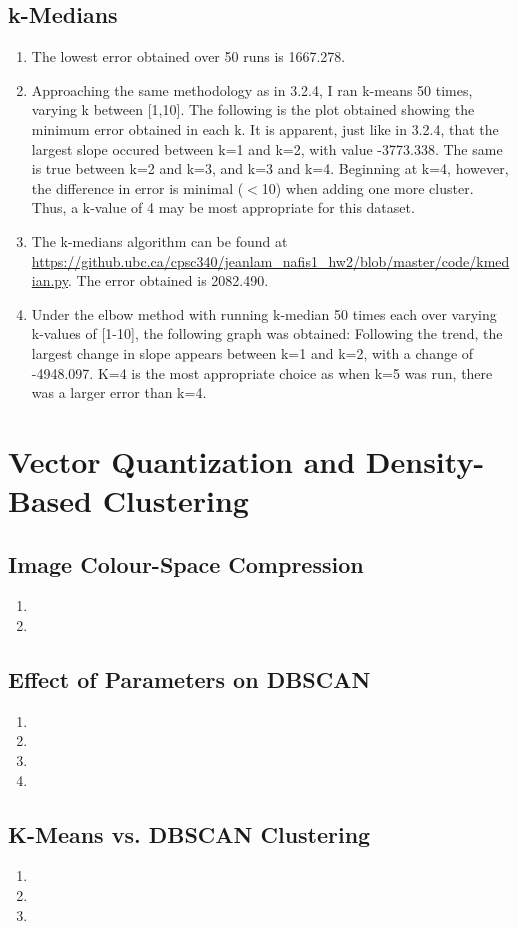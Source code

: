 \documentclass{article}
\begin{document}
\subsection{k-Medians}
\begin{enumerate}
\item {} The lowest error obtained over 50 runs is 1667.278.
\item Approaching the same methodology as in 3.2.4, I ran k-means 50 times, varying k between [1,10]. The following is the plot obtained showing the minimum error obtained in each k.  It is apparent, just like in 3.2.4, that the largest slope occured between k=1 and k=2, with value -3773.338. The same is true between k=2 and k=3, and k=3 and k=4. Beginning at k=4, however, the difference in error is minimal (${<}$10) when adding one more cluster. Thus, a k-value of 4 may be most appropriate for this dataset.
\item The k-medians algorithm can be found at \url{https://github.ubc.ca/cpsc340/jeanlam_nafis1_hw2/blob/master/code/kmedian.py}. The error obtained is 2082.490.
\item Under the elbow method with running k-median 50 times each over varying k-values of [1-10], the following graph was obtained:  Following the trend, the largest change in slope appears between k=1 and k=2, with a change of -4948.097. K=4 is the most appropriate choice as when k=5 was run, there was a larger error than k=4. 
\end{enumerate}

\section{Vector Quantization and Density-Based Clustering}
\subsection{Image Colour-Space Compression}
\begin{enumerate}
\item
\item
\end{enumerate}
\subsection{Effect of Parameters on DBSCAN}
\begin{enumerate}
\item
\item
\item
\item
\end{enumerate}
\subsection{K-Means vs. DBSCAN Clustering}
\begin{enumerate}
\item
\item
\item
\end{enumerate}
\end{document}
